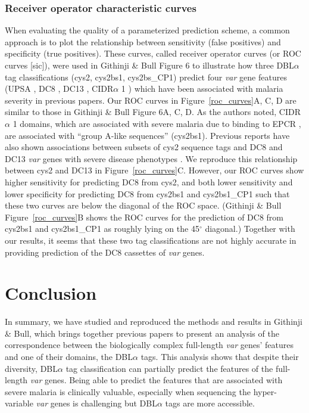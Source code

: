 \documentclass[10pt,twocolumn,superscriptaddress]{revtex4-1}
\newcommand{\var}{{\it var}\xspace}
\newcommand{\dbla}{{DBL$\alpha$}\xspace}
\newcommand{\cidra}{{CIDR$\alpha$}\xspace}
\newcommand{\paper}{{Githinji \& Bull}\xspace}
\begin{document}
\subsubsection{Receiver operator characteristic curves}
When evaluating the quality of a parameterized prediction scheme, a common approach is to plot the relationship between sensitivity (false positives) and specificity (true positives). These curves, called receiver operator curves (or ROC curves [sic]), were used in \paper Figure 6 to illustrate how three \dbla tag classifications (cys2, cys2bs1, cys2bs\_CP1) predict four \var gene features (UPSA \cite{warimwe2012}, DC8 \cite{lavstsen2012} \cite{rask2010}, DC13 \cite{warimwe2012}, \cidra1 \cite{turner2013}) which have been associated with malaria severity in previous papers. Our ROC curves in Figure~\ref{roc_curves}A, C, D are similar to those in \paper Figure 6A, C, D. As the authors noted, \cidra1 domains, which are associated with severe malaria due to binding to EPCR \cite{turner2013}, are associated with ``group A-like sequences'' (cys2bs1). Previous reports have also shown associations between subsets of cys2 sequence tags and DC8 and DC13 \var genes with severe disease phenotypes \cite{warimwe2012}. We reproduce this relationship between cys2 and DC13 in Figure~\ref{roc_curves}C. However, our ROC curves show higher sensitivity for predicting DC8 from cys2, and both lower sensitivity and lower specificity for predicting DC8 from cys2bs1 and cys2bs1\_CP1 such that these two curves are below the diagonal of the ROC space. (\paper Figure~\ref{roc_curves}B shows the ROC curves for the prediction of DC8 from cys2bs1 and cys2bs1\_CP1 as roughly lying on the 45$^{\circ}$ diagonal.) Together with our results, it seems that these two tag classifications are not highly accurate in providing prediction of the DC8 cassettes of \var genes. 


\section{Conclusion}
In summary, we have studied and reproduced the methods and results in \paper, which brings together previous papers to present an analysis of the correspondence between the biologically complex full-length \var genes' features and one of their domains, the \dbla tags. This analysis shows that despite their diversity, \dbla tag classification can partially predict the features of the full-length \var genes. Being able to predict the features that are associated with severe malaria is clinically valuable, especially when sequencing the hyper-variable \var genes is challenging but \dbla tags are more accessible. 
\end{document}
